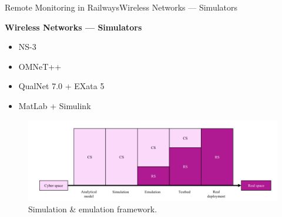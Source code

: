 \begin{frame}{Remote Monitoring in Railways}{Wireless Networks --- Simulators}
\begin{block}{\textbf{Wireless Networks --- Simulators}}
	
	\begin{minipage}[t]{0.48\linewidth}
		\begin{itemize}
			\item NS-3
			\item OMNeT++
			\item QualNet 7.0 + EXata 5
			\item MatLab + Simulink
		\end{itemize}
	\end{minipage}\hfill
	\begin{minipage}[t]{0.48\linewidth}
		
		\begin{figure}[ht!]
			\centering
			\includegraphics[width=1\textwidth,keepaspectratio]{figures/33.WirelessN/simul_VS_emul}
			\caption{Simulation \& emulation framework.}
		\end{figure}
	
	\end{minipage}
	
	
	
\end{block}
\end{frame}






	
